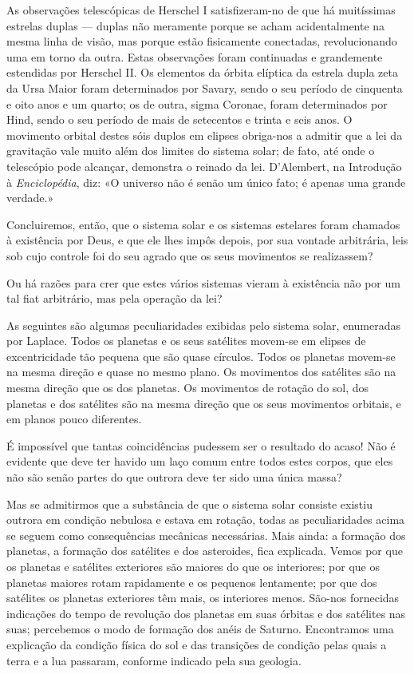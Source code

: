 \documentclass[11pt,a5paper,twoside,openany]{book}
\begin{document}
As observações telescópicas de Herschel I satisfizeram-no de que há muitíssimas estrelas duplas — duplas não meramente porque se acham acidentalmente na mesma linha de visão, mas porque estão fisicamente conectadas, revolucionando uma em torno da outra. Estas observações foram continuadas e grandemente estendidas por Herschel II. Os elementos da órbita elíptica da estrela dupla zeta da Ursa Maior foram determinados por Savary, sendo o seu período de cinquenta e oito anos e um quarto; os de outra, sigma Coronae, foram determinados por Hind, sendo o seu período de mais de setecentos e trinta e seis anos. O movimento orbital destes sóis duplos em elipses obriga-nos a admitir que a lei da gravitação vale muito além dos limites do sistema solar; de fato, até onde o telescópio pode alcançar, demonstra o reinado da lei. D'Alembert, na Introdução à \textit{Enciclopédia}, diz: «O universo não é senão um único fato; é apenas uma grande verdade.»

Concluiremos, então, que o sistema solar e os sistemas estelares foram chamados à existência por Deus, e que ele lhes impôs depois, por sua vontade arbitrária, leis sob cujo controle foi do seu agrado que os seus movimentos se realizassem?

Ou há razões para crer que estes vários sistemas vieram à existência não por um tal fiat arbitrário, mas pela operação da lei?

As seguintes são algumas peculiaridades exibidas pelo sistema solar, enumeradas por Laplace. Todos os planetas e os seus satélites movem-se em elipses de excentricidade tão pequena que são quase círculos. Todos os planetas movem-se na mesma direção e quase no mesmo plano. Os movimentos dos satélites são na mesma direção que os dos planetas. Os movimentos de rotação do sol, dos planetas e dos satélites são na mesma direção que os seus movimentos orbitais, e em planos pouco diferentes.

É impossível que tantas coincidências pudessem ser o resultado do acaso! Não é evidente que deve ter havido um laço comum entre todos estes corpos, que eles não são senão partes do que outrora deve ter sido uma única massa?

Mas se admitirmos que a substância de que o sistema solar consiste existiu outrora em condição nebulosa e estava em rotação, todas as peculiaridades acima se seguem como consequências mecânicas necessárias. Mais ainda: a formação dos planetas, a formação dos satélites e dos asteroides, fica explicada. Vemos por que os planetas e satélites exteriores são maiores do que os interiores; por que os planetas maiores rotam rapidamente e os pequenos lentamente; por que dos satélites os planetas exteriores têm mais, os interiores menos. São-nos fornecidas indicações do tempo de revolução dos planetas em suas órbitas e dos satélites nas suas; percebemos o modo de formação dos anéis de Saturno. Encontramos uma explicação da condição física do sol e das transições de condição pelas quais a terra e a lua passaram, conforme indicado pela sua geologia.
\end{document}
